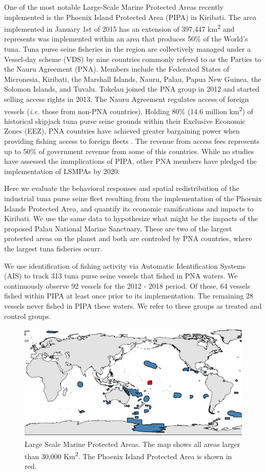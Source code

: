 \documentclass[9p,twocolumn,twoside,lineno]{pnas-new}
\begin{document}
One of the most notable Large-Scale Marine Protected Areas recently implemented is the Phoenix Island Protected Area (PIPA) in Kiribati. The area implemented in January 1st of 2015 has an extension of 397,447 km\textsuperscript{2} and represents was implemented within an area that produces 50\% of the World's tuna. Tuna purse seine fisheries in the region are collectively managed under a Vessel-day scheme (VDS) by nine countries commonly refered to as the Parties to the Nauru Agreement (PNA). Members include the Federated States of Micronesia, Kiribati, the Marshall Islands, Nauru, Palau, Papua New Guinea, the Solomon Islands, and Tuvalu. Tokelau joined the PNA group in 2012 and started selling access rights in 2013. The Nauru Agreement regulates access of foreign vessels (\emph{i.e.} those from non-PNA countries). Holding 80\% (14.6 million km\textsuperscript{2}) of historical skipjack tuna purse seine grounds within their Exclusive Economic Zones (EEZ), PNA countries have achieved greater bargaining power when providing fishing access to foreign fleets \cite{havice_2010}. The revenue from access fees represents up to 50\% of government revenue from some of this countries. While no studies have assessed the immplications of PIPA, other PNA members have pledged the implementation of LSMPAs by 2020.

Here we evaluate the behavioral responses and spatial redistribution of the industrial tuna purse seine fleet resulting from the implementation of the Phoenix Islands Protected Area, and quantify its economic ramifications and impacts to Kiribati. We use the same data to hypothesize what might be the impacts of the proposed Palau National Marine Sanctuary. These are two of the largest protected areas on the planet and both are controled by PNA countries, where the largest tuna fisheries ocurr.

We use identification of fishing activity via Automatic Identification Systems (AIS) to track 313 tuna purse seine vessels that fished in PNA waters. We continuously observe 92 vessels for the 2012 - 2018 period. Of these, 64 vessels fished within PIPA at least once prior to its implementation. The remaining 28 vessels never fished in PIPA these waters. We refer to these groups as treated and control groups.

\begin{figure}
\centering
\includegraphics{img/LSMPAs_map.pdf}
\caption{\label{fig:LSMPAs_map}Large Scale Marine Protected Areas. The map shows all areas larger than 30,000 Km\textsuperscript{2}. The Phoenix Island Protected Area is shown in red.}
\end{figure}
\end{document}

